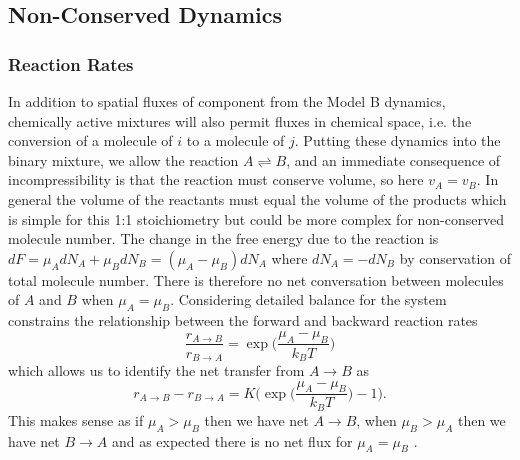 \subsection{Non-Conserved Dynamics}

\subsubsection{Reaction Rates}
In addition to spatial fluxes of component from the Model B dynamics, chemically active mixtures will also permit fluxes in chemical space, i.e. the conversion of a molecule of $i$ to a molecule of $j$. Putting these dynamics into the binary mixture, we allow the reaction $A \rightleftharpoons B$, and an immediate consequence of incompressibility is that the reaction must conserve volume, so here $v_A = v_B$. In general the volume of the reactants must equal the volume of the products which is simple for this 1:1 stoichiometry but could be more complex for non-conserved molecule number. The change in the free energy due to the reaction is $dF = \mu_A dN_A+\mu_B dN_B = (\mu_A - \mu_B)dN_A$ where $dN_A = -dN_B$ by conservation of total molecule number. There is therefore no net conversation between molecules of $A$ and $B$ when $\mu_A = \mu_B$. Considering detailed balance \cite{weber_drops_2021} for the system constrains the relationship between the forward and backward reaction rates
\begin{equation}
    \frac{r_{A \rightarrow B}}{r_{B \rightarrow A}} = \exp\Bigg(\frac{\mu_A - \mu_B}{k_B T}\Bigg)
    \label{db_constr}
\end{equation}
which allows us to identify the net transfer from $A \rightarrow B$ as
\begin{equation}
    r_{A \rightarrow B} - r_{B \rightarrow A} = K\Bigg(\exp\bigg(\frac{\mu_A - \mu_B}{k_B T}\bigg)-1\Bigg).
    \label{eq:sponrate}
\end{equation}
This makes sense as if $\mu_A > \mu_B$ then we have net $A \rightarrow B$, when $\mu_B > \mu_A$ then we have net $B \rightarrow A$ and as expected there is no net flux for $\mu_A = \mu_B$ \cite{weber2019physics}.

